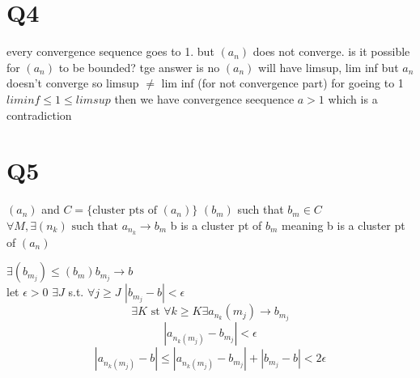 \documentclass{article}
\begin{document}
\section{Q4}
every convergence sequence goes to 1. but $(a_n) $ does not converge. is it possible for $(a_n)$ to be bounded?
tge answer is no 
$(a_n)$ will have limsup, lim inf 
but $a_n$ doesn't converge so limsup $\neq$ lim inf (for not convergence part) 
for goeing to 1 $liminf \leq 1 \leq limsup$ then we have convergence seequence $a > 1$ which is a contradiction 


\section{Q5}
$(a_n)$ and $C = \{\text{cluster pts of } (a_n)\}$
$(b_m)$ such that $b_m \in C$
$\forall M, \exists (n_k) \text{ such that } a_{n_k} \rightarrow b_m$
b is a cluster pt of $b_m$ meaning b is a cluster pt of $(a_n)$ 

$\exists (b_{m_j}) \leq (b_m) b_{m_j}  \rightarrow b$ \\
let $\epsilon > 0$ $\exists J$ s.t. $\forall j \geq J$ $|b_{m_j} - b| < \epsilon$
$$\exists K \text{ st } \forall k \geq K \exists a_{n_k}(m_j) \rightarrow b_{m_j}$$ 
$$|a_{n_k (m_j)} - b_{m_j} | < \epsilon$$ 
$$|a_{n_k(m_j)} - b| \leq |a_{n_k(m_j)} - b_{m_j}| + |b_{m_j} - b| < 2\epsilon$$
\end{document}
